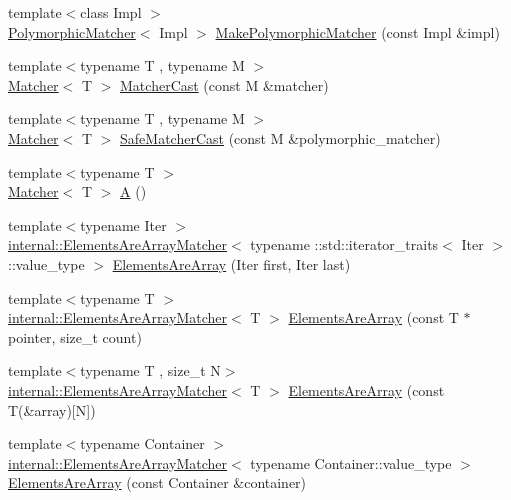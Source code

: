 \begin{DoxyCompactItemize}
\item 
{\footnotesize template$<$class Impl $>$ }\\\hyperlink{classtesting_1_1PolymorphicMatcher}{Polymorphic\+Matcher}$<$ Impl $>$ \hyperlink{namespacetesting_a667ca94f190ec2e17ee2fbfdb7d3da04}{Make\+Polymorphic\+Matcher} (const Impl \&impl)
\item 
{\footnotesize template$<$typename T , typename M $>$ }\\\hyperlink{classtesting_1_1Matcher}{Matcher}$<$ T $>$ \hyperlink{namespacetesting_a8234d15eee99b135a7fdf2141a2ebe1f}{Matcher\+Cast} (const M \&matcher)
\item 
{\footnotesize template$<$typename T , typename M $>$ }\\\hyperlink{classtesting_1_1Matcher}{Matcher}$<$ T $>$ \hyperlink{namespacetesting_ac016ac22aa065a19b9ef95f0ccffc17b}{Safe\+Matcher\+Cast} (const M \&polymorphic\+\_\+matcher)
\item 
{\footnotesize template$<$typename T $>$ }\\\hyperlink{classtesting_1_1Matcher}{Matcher}$<$ T $>$ \hyperlink{namespacetesting_a5e9134d655d2fc9323902348083282e7}{A} ()
\item 
{\footnotesize template$<$typename Iter $>$ }\\\hyperlink{classtesting_1_1internal_1_1ElementsAreArrayMatcher}{internal\+::\+Elements\+Are\+Array\+Matcher}$<$ typename \+::std\+::iterator\+\_\+traits$<$ Iter $>$\+::value\+\_\+type $>$ \hyperlink{namespacetesting_ae2eee06e7ddbf5f5372fd24372e9703f}{Elements\+Are\+Array} (Iter first, Iter last)
\item 
{\footnotesize template$<$typename T $>$ }\\\hyperlink{classtesting_1_1internal_1_1ElementsAreArrayMatcher}{internal\+::\+Elements\+Are\+Array\+Matcher}$<$ T $>$ \hyperlink{namespacetesting_abf5c2219b4e6a7542368b5f68eadd007}{Elements\+Are\+Array} (const T $\ast$pointer, size\+\_\+t count)
\item 
{\footnotesize template$<$typename T , size\+\_\+t N$>$ }\\\hyperlink{classtesting_1_1internal_1_1ElementsAreArrayMatcher}{internal\+::\+Elements\+Are\+Array\+Matcher}$<$ T $>$ \hyperlink{namespacetesting_ac5895c9867d6b976351446a043dcdd66}{Elements\+Are\+Array} (const T(\&array)\mbox{[}N\mbox{]})
\item 
{\footnotesize template$<$typename Container $>$ }\\\hyperlink{classtesting_1_1internal_1_1ElementsAreArrayMatcher}{internal\+::\+Elements\+Are\+Array\+Matcher}$<$ typename Container\+::value\+\_\+type $>$ \hyperlink{namespacetesting_ad257747adbe056feaa92f449063d681f}{Elements\+Are\+Array} (const Container \&container)

\end{DoxyCompactItemize}
